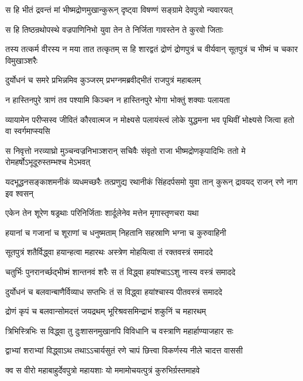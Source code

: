 \twolineshloka
{स हि भीतं द्रवन्तं मां भीष्मद्रोणमुखान्कुरून्}
{दृष्ट्वा विषण्णं सङ्ग्रामे देवपुत्रो न्यवारयत्}


\twolineshloka
{स हि तिष्ठन्रथोपस्थे वज्रपाणिनिभो युवा}
{तेन ते निर्जिता गावस्तेन ते कुरवो जिताः}


\threelineshloka
{तस्य तत्कर्म वीरस्य न मया तात तत्कृतम्}
{स हि शारद्वतं द्रोणं द्रोणपुत्रं च वीर्यवान्}
{सूतपुत्रं च भीष्मं च चकार विमुखाञ्शरैः}


\twolineshloka
{दुर्योधनं च समरे प्रभिन्नमिव कुञ्जरम्}
{प्रभग्नमब्रवीद्भीतं राजपुत्रं महाबलम्}


\twolineshloka
{न हास्तिनपुरे त्राणं तव पश्यामि किञ्चन}
{न हास्तिनपुरे भोगा भोक्तुं शक्याः पलायता}


\threelineshloka
{व्यायामेन परीप्सस्व जीवितं कौरवात्मज}
{न मोक्ष्यसे पलायंस्त्वं लोके युद्धमना भव}
{पृथिवीं भोक्ष्यसे जित्वा हतो वा स्वर्गमाप्स्यसि}


\threelineshloka
{स निवृत्तो नरव्याघ्रो मुञ्चन्वज्रनिभाञ्शरान्}
{सचिवैः संवृतो राजा भीष्मद्रोणकृपादिभिः}
{ततो मे रोमहर्षोऽभूदूरुस्तम्भश्च मेऽभवत्}


\threelineshloka
{यदभूद्धनसङ्काशमनीकं व्यधमच्छरैः}
{तत्प्रणुद्य रथानीकं सिंहदर्पसमो युवा}
{तान् कुरून् द्रावयद् राजन् रणे नाग इव श्वसन्}


\twolineshloka
{एकेन तेन शूरेण षड्रथाः परिनिर्जिताः}
{शार्दूलेनेव मत्तेन मृगास्तृणचरा यथा}


\twolineshloka
{हयानां च गजानां च शूराणां च धनुष्मताम्}
{निहतानि सहस्राणि भग्ना च कुरुवाहिनी}


\twolineshloka
{सूतपुत्रं शतैर्विद्ध्वा हयान्हत्वा महारथः}
{अस्त्रेण मोहयित्वा तं रक्तवस्त्रं समाददे}


\twolineshloka
{चतुर्भिः पुनरानर्च्छद्भीष्मं शान्तनवं शरैः}
{स तं विद्ध्वा हयांश्चाऽऽशु नास्य वस्त्रं समाददे}


\twolineshloka
{दुर्योधनं च बलवान्बाणैर्विव्याध सप्तभिः}
{तं स विद्ध्वा हयांश्चास्य पीतवस्त्रं समाददे}


\twolineshloka
{द्रोणं कृपं च बलवान्सोमदत्तं जयद्रथम्}
{भूरिश्रवसमिन्द्राभं शकुनिं च महारथम्}


\twolineshloka
{त्रिभिस्त्रिभिः स विद्ध्वा तु दुःशासनमुखानपि}
{विविधानि च वस्त्राणि महार्हाण्याजहार सः}


\twolineshloka
{द्वाभ्यां शराभ्यां विद्ध्वाऽथ तथाऽऽचार्यसुतं रणे}
{चापं छित्त्वा विकर्णस्य नीले चादत्त वाससी}




\twolineshloka
{क्व स वीरो महाबाहुर्देवपुत्रो महायशाः}
{यो ममामोचयत्पुत्रं कुरुभिर्ग्रस्तमाहवे}


